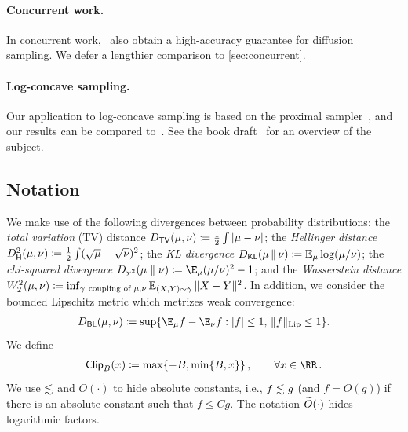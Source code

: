 \documentclass{article} %
\let\oldparagraph\paragraph
\renewcommand{\paragraph}[1]{\oldparagraph{#1.}}
\begin{document}
\paragraph{Concurrent work} In concurrent work,~\citet{gatmiry2026high} also obtain a high-accuracy guarantee for diffusion sampling.
We defer a lengthier comparison to
\cref{sec:concurrent}.

\paragraph{Log-concave sampling}
Our application to log-concave sampling is based on the proximal sampler~\citep{LeeSheTia21RGO, Chen+22ProxSampler}, and our results can be compared to~\citet{AltChe24Warm, FanYuaChe23ImprovedProx}.
See the book draft~\citet{Chewi26Book} for an overview of the subject.

\subsection{Notation}


We make use of the following divergences between probability distributions: the \emph{total variation} (TV) distance $\Dtv{\mu}{\nu} \deq \frac{1}{2}\int|\mu-\nu|$; the \emph{Hellinger distance} $\Dhels{\mu}{\nu} \deq \frac12\int (\sqrt\mu-\sqrt\nu)^2$; the \emph{KL divergence} $\Dkl{\mu}{\nu} \deq \En_\mu\log(\mu/\nu)$; the \emph{chi-squared divergence} $\Dchis{\mu}{\nu} \deq \E_\mu (\mu/\nu)^2 - 1$; and the \emph{Wasserstein distance} $W_2^2(\mu,\nu) \coloneqq \inf_{\gamma~\text{coupling of }\mu,\nu} \operatorname{\mathbb{E}}_{(X,Y)\sim\gamma}\|X-Y\|^2$.
In addition, we consider the bounded Lipschitz metric which metrizes weak convergence:
\begin{align}
\label{def:BL-metric}
    \Dbl{\mu}{\nu} \deq \sup\{\E_\mu f - \E_\nu f : |f| \le 1,\,\|f\|_{\rm Lip} \le 1\}.
\end{align}
We define
\begin{align}\notag
    \pclip[\B]{x}\deq \max\crl{-B,\min\crl{B,x}}\,, \qquad \forall x\in\RR\,.
\end{align}
We use $\lesssim$ and $O(\cdot)$ to hide absolute constants, i.e., $f\lesssim g$ (and $f=O(g)$) if there is an absolute constant such that $f\leq Cg$.
The notation $\widetilde{O}(\cdot)$ hides logarithmic factors.
\end{document}
